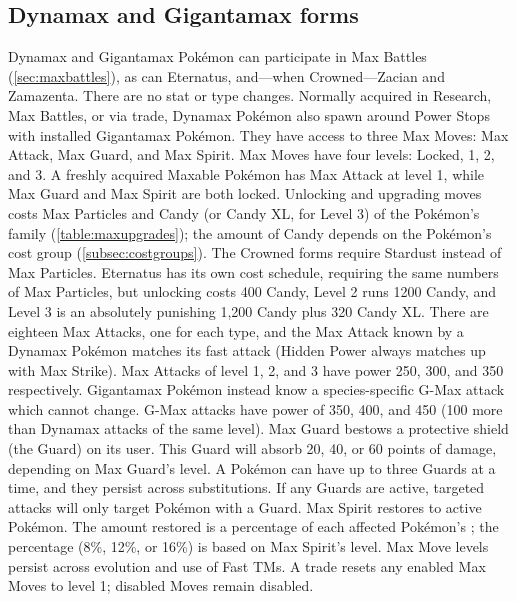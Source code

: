 \subsection{Dynamax and Gigantamax forms\label{sec:dmaxgmax}}
Dynamax and Gigantamax Pokémon can participate in Max Battles (\autoref{sec:maxbattles}),
 as can Eternatus, and---when Crowned---Zacian and Zamazenta.
There are no stat or type changes.
Normally acquired in Research, Max Battles, or via trade,
 Dynamax Pokémon also spawn around Power Stops with installed Gigantamax Pokémon.
They have access to three Max Moves: Max Attack, Max Guard, and Max Spirit.
Max Moves have four levels: Locked, 1, 2, and 3.
A freshly acquired Maxable Pokémon has Max Attack at level 1, while Max Guard and Max Spirit are both locked.
Unlocking and upgrading moves costs Max Particles and Candy (or Candy XL, for Level 3) of the Pokémon's family (\autoref{table:maxupgrades});
 the amount of Candy depends on the Pokémon's cost group (\autoref{subsec:costgroups}).
The Crowned forms require Stardust instead of Max Particles.
Eternatus has its own cost schedule, requiring the same numbers of Max Particles,
 but unlocking costs 400 Candy, Level 2 runs 1200 Candy, and
 Level 3 is an absolutely punishing 1,200 Candy plus 320 Candy XL\@.
There are eighteen Max Attacks, one for each type, and the Max Attack known by a Dynamax Pokémon matches its fast attack
 (Hidden Power always matches up with Max Strike).
Max Attacks of level 1, 2, and 3 have power 250, 300, and 350 respectively.
Gigantamax Pokémon instead know a species-specific G-Max attack which cannot change.
G-Max attacks have power of 350, 400, and 450 (100 more than Dynamax attacks of the same level).
Max Guard bestows a protective shield (the Guard) on its user.
This Guard will absorb 20, 40, or 60 points of damage, depending on Max Guard's level.
A Pokémon can have up to three Guards at a time, and they persist across substitutions.
If any Guards are active, targeted attacks will only target Pokémon with a Guard.
Max Spirit restores \HP{} to active Pokémon.
The amount restored is a percentage of each affected Pokémon's \MHP\@;
  the percentage (8\%, 12\%, or 16\%) is based on Max Spirit's level.
Max Move levels persist across evolution and use of Fast TMs.
A trade resets any enabled Max Moves to level 1; disabled Moves remain disabled.


